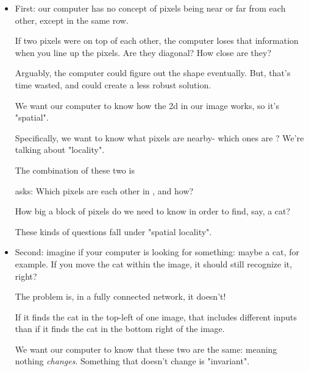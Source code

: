             \begin{itemize}
                \item First: our computer has no concept of pixels being near or far from each other, except in the same row. 
                
                    If two pixels were on top of each other, the computer loses that information when you line up the pixels. Are they diagonal? How close are they?
                
                    Arguably, the computer could figure out the shape eventually. But, that's time wasted, and could create a less robust solution.
                    
                    We want our computer to know how the 2d  in our image works, so it's "spatial". 
                    
                    Specifically, we want to know what pixels are nearby- which ones are ? We're talking about "locality". 
                    
                    The combination of these two is\\
                
                    \begin{definition}
                    
                         asks: Which pixels are  each other in , and how? 
                    \end{definition}
                    
                    How big a block of pixels do we need to know in order to find, say, a cat? 
                    
                    These kinds of questions fall under "spatial locality".
            
                \item Second: imagine if your computer is looking for something: maybe a cat, for example. If you move the cat within the image, it should still recognize it, right?
                
                    The problem is, in a fully connected network, it doesn't! 
                    
                    If it finds the cat in the top-left of one image, that includes different inputs than if it finds the cat in the bottom right of the image.
                    
                    We want our computer to know that these two are the same: meaning nothing \textit{changes}. Something that doesn't change is "invariant".
                    

\end{itemize}
